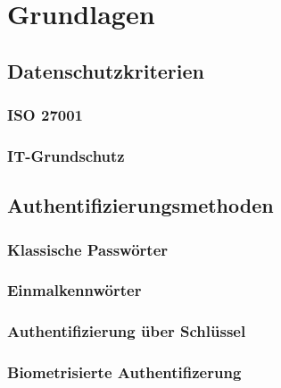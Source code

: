 \chapter{Grundlagen}

\section{Datenschutzkriterien}
\subsection{ISO 27001}
\subsection{IT-Grundschutz}

\section{Authentifizierungsmethoden}
\subsection{Klassische Passwörter}
\subsection{Einmalkennwörter}
\subsection{Authentifizierung über Schlüssel}
\subsection{Biometrisierte Authentifizerung}
